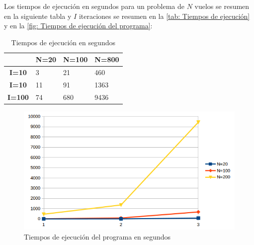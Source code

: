 Los tiempos de ejecución en segundos para un problema de $N$ vuelos se resumen en la siguiente tabla y $I$ iteraciones se resumen en la \autoref{tab: Tiempos de ejecución} y en la \autoref{fig: Tiempos de ejecución del programa}:

\begin{table}[h]
	\centering
	\caption{Tiempos de ejecución en segundos }
	\label{tab: Tiempos de ejecución}
	\begin{tabular}{c|l|l|l|}
		\cline{2-4}
		& \multicolumn{1}{c|}{\textbf{N=20}} & \multicolumn{1}{c|}{\textbf{N=100}} & \multicolumn{1}{c|}{\textbf{N=800}} \\ \hline
		\multicolumn{1}{|c|}{\textbf{I=10}} &3  &21  &460  \\ \hline
		\multicolumn{1}{|c|}{\textbf{I=10}} &11  &91  &1363  \\ \hline
		\multicolumn{1}{|c|}{\textbf{I=100}} &74  &680  &9436  \\ \hline
	\end{tabular}
\end{table}


\begin{figure}[]
	\begin{center}
		\centering
		\includegraphics[width=1\textwidth]{./imagenes/resultados/tiemposejecucion.png}
		\caption{Tiempos de ejecución del programa en segundos}
		\label{fig: Tiempos de ejecución del programa}
	\end{center}
\end{figure}

